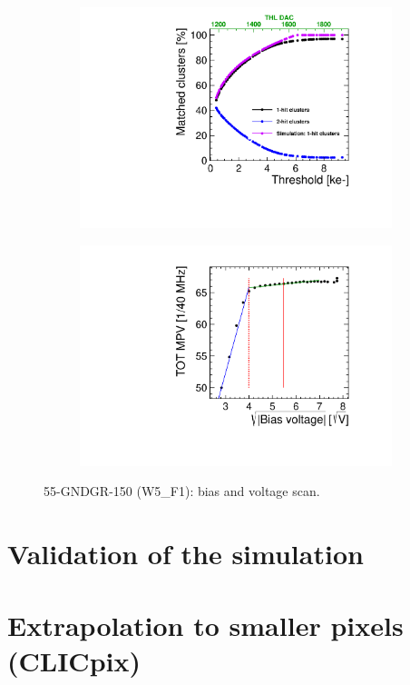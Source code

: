\begin{figure}[htbp] \centering
  \begin{subfigure}[b]{0.45\textwidth}
    \includegraphics[width=\textwidth]{./figures/TestBeam/ThresholdScan_W0005_F01.pdf}
    \caption{}
  \end{subfigure} \hfill
  \begin{subfigure}[b]{0.45\textwidth}
    \includegraphics[width=\textwidth]{./figures/TestBeam/depletionVoltage_W0005_F01.pdf}
    \caption{}
  \end{subfigure}
  \caption{55-GNDGR-150 (W5\_F1): bias and voltage scan.}
  \label{fig:Timepix3_THLscan_Vdep_F1}
\end{figure}


\section{Validation of the simulation}
\section{Extrapolation to smaller pixels (CLICpix)}